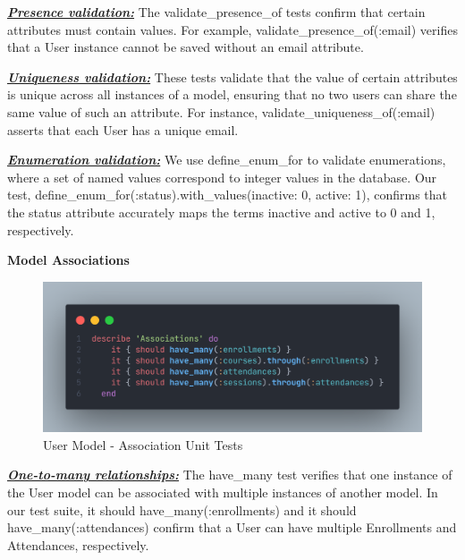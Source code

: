 \begin{justify}
\vspace{0.25cm}
\noindent\noindent\textbf{\textit{\underline{Presence validation:}}} The validate\_presence\_of tests confirm that certain attributes must contain values. For example, validate\_presence\_of(:email) verifies that a User instance cannot be saved without an email attribute.

\vspace{0.25cm}
\noindent\textbf{\textit{\underline{Uniqueness validation:}}} These tests validate that the value of certain attributes is unique across all instances of a model, ensuring that no two users can share the same value of such an attribute. For instance, validate\_uniqueness\_of(:email) asserts that each User has a unique email.

\vspace{0.25cm}
\noindent\textbf{\textit{\underline{Enumeration validation:}}} We use define\_enum\_for to validate enumerations, where a set of named values correspond to integer values in the database. Our test, define\_enum\_for(:status).with\_values(inactive: 0, active: 1), confirms that the status attribute accurately maps the terms inactive and active to 0 and 1, respectively.

\vspace{0.25cm}
\newendline
\textbf{Model Associations}

    \begin{figure}[H]
        \centerline{\includegraphics[width=140mm,scale=1]{figures/implementation_and_testing/testing/AUT/user/associations.png}}
        \caption{User Model - Association Unit Tests}
        \label{User Model - Association Unit Tests}
    \end{figure}

\vspace{0.25cm}
\noindent\textbf{\textit{\underline{One-to-many relationships:}}} The have\_many test verifies that one instance of the User model can be associated with multiple instances of another model. In our test suite, it { should have\_many(:enrollments) } and it { should have\_many(:attendances) } confirm that a User can have multiple Enrollments and Attendances, respectively.


\end{justify}
